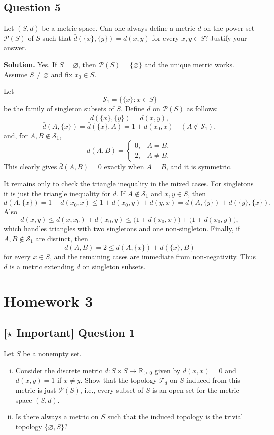 \documentclass{article}
\newcommand{\R}{\mathbb{R}}
\newcommand{\important}{\texorpdfstring{\textbf{[\(\star\) Important]}}{[Important]}}
\newenvironment{solution}{\par\noindent\textbf{Solution.}\quad}{\par}
\begin{document}
\subsection{Question 5}
Let $(S, d)$ be a metric space. Can one always define a metric $\bar d$ on the power set $\mathcal{P}(S)$ of $S$ such that $\bar d(\{x\}, \{y\}) = d(x, y)$ for every $x, y \in S$? Justify your answer.

\begin{solution}
Yes. If $S=\varnothing$, then $\mathcal P(S)=\{\varnothing\}$ and the
unique metric works. Assume $S\ne\varnothing$ and fix $x_0\in S$.

Let
\[
  \mathcal S_1=\{\{x\}:x\in S\}
\]
be the family of singleton subsets of $S$. Define $\bar d$ on
$\mathcal P(S)$ as follows:
\[
  \bar d(\{x\},\{y\})=d(x,y),
\]
\[
  \bar d(A,\{x\})=\bar d(\{x\},A)=1+d(x_0,x)
  \quad(A\notin\mathcal S_1),
\]
and, for $A,B\notin\mathcal S_1$,
\[
  \bar d(A,B)=
  \begin{cases}
    0,&A=B,\\
    2,&A\ne B.
  \end{cases}
\]
This clearly gives $\bar d(A,B)=0$ exactly when $A=B$, and it is symmetric.

It remains only to check the triangle inequality in the mixed cases. For
singletons it is just the triangle inequality for $d$. If $A\notin
\mathcal S_1$ and $x,y\in S$, then
\[
  \bar d(A,\{x\})=1+d(x_0,x)
  \le 1+d(x_0,y)+d(y,x)
  =\bar d(A,\{y\})+\bar d(\{y\},\{x\}).
\]
Also
\[
  d(x,y)\le d(x,x_0)+d(x_0,y)
  \le \bigl(1+d(x_0,x)\bigr)+\bigl(1+d(x_0,y)\bigr),
\]
which handles triangles with two singletons and one non-singleton. Finally,
if $A,B\notin\mathcal S_1$ are distinct, then
\[
  \bar d(A,B)=2\le \bar d(A,\{x\})+\bar d(\{x\},B)
\]
for every $x\in S$, and the remaining cases are immediate from
non-negativity. Thus $\bar d$ is a metric extending $d$ on singleton
subsets.
\end{solution}

\section{Homework 3}

\subsection{\important{} Question 1}
Let $S$ be a nonempty set.
\begin{enumerate}[(i)]
  \item Consider the discrete metric $d : S \times S \to \R_{\ge 0}$ given by $d(x, x) = 0$ and $d(x, y) = 1$ if $x \ne y$. Show that the topology $\mathcal{T}_d$ on $S$ induced from this metric is just $\mathcal{P}(S)$, i.e., every subset of $S$ is an open set for the metric space $(S, d)$.
  \item Is there always a metric on $S$ such that the induced topology is the trivial topology $\{\varnothing, S\}$?
\end{enumerate}
\end{document}
